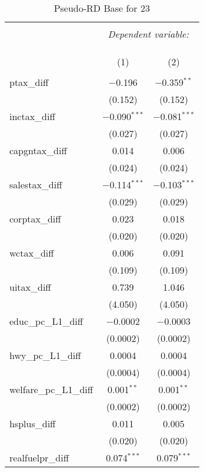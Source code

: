 
\begin{table}[!htbp] \centering 
  \caption{Pseudo-RD Base for  23} 
  \label{} 
\begin{tabular}{@{\extracolsep{5pt}}lcc} 
\\[-1.8ex]\hline 
\hline \\[-1.8ex] 
 & \multicolumn{2}{c}{\textit{Dependent variable:}} \\ 
\cline{2-3} 
\\[-1.8ex] & \multicolumn{2}{c}{ } \\ 
\\[-1.8ex] & (1) & (2)\\ 
\hline \\[-1.8ex] 
 ptax\_diff & $-$0.196 & $-$0.359$^{**}$ \\ 
  & (0.152) & (0.152) \\ 
  inctax\_diff & $-$0.090$^{***}$ & $-$0.081$^{***}$ \\ 
  & (0.027) & (0.027) \\ 
  capgntax\_diff & 0.014 & 0.006 \\ 
  & (0.024) & (0.024) \\ 
  salestax\_diff & $-$0.114$^{***}$ & $-$0.103$^{***}$ \\ 
  & (0.029) & (0.029) \\ 
  corptax\_diff & 0.023 & 0.018 \\ 
  & (0.020) & (0.020) \\ 
  wctax\_diff & 0.006 & 0.091 \\ 
  & (0.109) & (0.109) \\ 
  uitax\_diff & 0.739 & 1.046 \\ 
  & (4.050) & (4.050) \\ 
  educ\_pc\_L1\_diff & $-$0.0002 & $-$0.0003 \\ 
  & (0.0002) & (0.0002) \\ 
  hwy\_pc\_L1\_diff & 0.0004 & 0.0004 \\ 
  & (0.0004) & (0.0004) \\ 
  welfare\_pc\_L1\_diff & 0.001$^{**}$ & 0.001$^{**}$ \\ 
  & (0.0002) & (0.0002) \\ 
  hsplus\_diff & 0.011 & 0.005 \\ 
  & (0.020) & (0.020) \\ 
  realfuelpr\_diff & 0.074$^{***}$ & 0.079$^{***}$ \\ 

\end{tabular}
\end{table}
